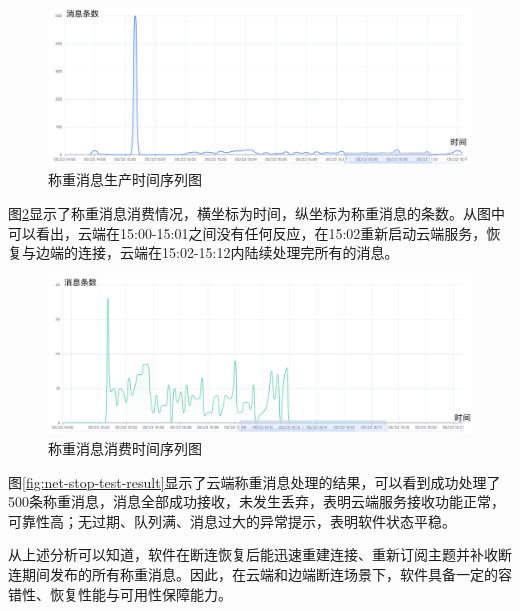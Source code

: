 \begin{figure}
    \centering
    \includegraphics[width=\linewidth]{../source/aws-test/net-stop-test-mqtt-broker-msg-produce.png}
    \caption{称重消息生产时间序列图}
    \label{fig:net-stop-test-mqtt-broker-msg-produce}
\end{figure}

图\ref{fig:net-stop-test-mqtt-broker-msg-consume}显示了称重消息消费情况，横坐标为时间，纵坐标为称重消息的条数。从图中可以看出，云端在15:00-15:01之间没有任何反应，在15:02重新启动云端服务，恢复与边端的连接，云端在15:02-15:12内陆续处理完所有的消息。

\begin{figure}
    \centering
    \includegraphics[width=\linewidth]{../source/aws-test/net-stop-test-mqtt-broker-msg-consume.png}
    \caption{称重消息消费时间序列图}
    \label{fig:net-stop-test-mqtt-broker-msg-consume}
\end{figure}

图\ref{fig:net-stop-test-result}显示了云端称重消息处理的结果，可以看到成功处理了500条称重消息，消息全部成功接收，未发生丢弃，表明云端服务接收功能正常，可靠性高；无过期、队列满、消息过大的异常提示，表明软件状态平稳。

从上述分析可以知道，软件在断连恢复后能迅速重建连接、重新订阅主题并补收断连期间发布的所有称重消息。因此，在云端和边端断连场景下，软件具备一定的容错性、恢复性能与可用性保障能力。


